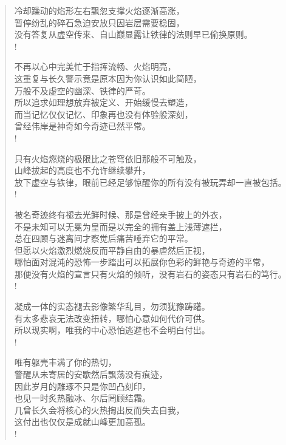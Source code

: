 \documentclass[UTF8, 12pt, a4paper]{ctexrep} %
\begin{document}
\begin{verse}

冷却躁动的焰形左右飘忽支撑火焰逐渐高涨，\\
暂停纷乱的碎石急迫安放只因岩层需要稳固，\\
没有答复从虚空传来、自山巅显露让铁律的法则早已偷换原则。\\!

不再以心中完美忙于指挥流畅、火焰明亮，\\
这重复与长久警示竟是原本因为你认识如此简陋，\\
万般不及虚空的幽深、铁律的严苛。\\
所以追求如理想放弃被定义、开始缓慢去塑造，\\
而当记忆仅仅记忆、印象再也没有体验般深刻，\\
曾经伟岸是神奇如今奇迹已然平常。\\!

只有火焰燃烧的极限比之苍穹依旧那般不可触及，\\
山峰拔起的高度也不允许继续攀升，\\
放下虚空与铁律，眼前已经足够惊醒你的所有没有被玩弄却一直被包括。\\!

被名奇迹终有褪去光鲜时候、那是曾经亲手披上的外衣，\\
不是未知可以无冕为皇而是以完全的拥有盖上浅薄遮拦，\\
总在四顾与迷离间才察觉后痛苦唾弃它的平常。\\
但愿以火焰激烈燃烧反而平静自由的暴虐然后正视，\\
哪怕面对混沌的恐怖一步踏出可以拓展你色彩的鲜艳与奇迹的平常，\\
那便没有火焰的宣言只有火焰的倾听，没有岩石的姿态只有岩石的笃行。\\!

凝成一体的实态褪去影像繁华乱目，勿须犹豫踌躇。\\
有太多悲哀无法改变扭转，哪怕心意如何代价可供。\\
所以现实啊，唯我的中心恐怕逃避也不会明白付出。\\!

唯有躯壳丰满了你的热切，\\
警醒从未寄居的安歇然后飘荡没有痕迹，\\
因此岁月的雕琢不只是你凹凸刻印，\\
也见一时炙热融冰、尔后罔顾结霜。\\
几曾长久会将核心的火热掏出反而失去自我，\\
这付出也仅仅是成就山峰更加高孤。\\!


\end{verse}
\end{document}
